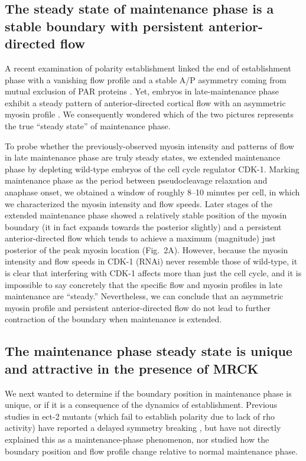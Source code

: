 \documentclass[11pt]{article}
\newcommand{\6}[1]{#1_{\text{6}}}
\newcommand{\3}[1]{#1_{\text{3}}}
\begin{document}
\subsection*{The steady state of maintenance phase is a stable boundary with persistent anterior-directed flow}
A recent examination of polarity establishment linked the end of establishment phase with a vanishing flow profile and a stable A/P asymmetry coming from mutual exclusion of PAR proteins \citep{gross2019guiding}. Yet, embryos in late-maintenance phase exhibit a steady pattern of anterior-directed cortical flow with an asymmetric myosin profile \citep[Fig.~2]{sailer2015dynamic}. We consequently wondered which of the two pictures represents the true ``steady state'' of maintenance phase.  

To probe whether the previously-observed myosin intensity and patterns of flow in late maintenance phase are truly steady states, we extended maintenance phase by depleting wild-type embryos of the cell cycle regulator CDK-1. Marking maintenance phase as the period between pseudocleavage relaxation and anaphase onset, we obtained a window of roughly 8--10 minutes per cell, in which we characterized the myosin intensity and flow speeds. Later stages of the extended maintenance phase showed a relatively stable position of the myosin boundary (it in fact expands towards the posterior slightly) and a persistent anterior-directed flow which tends to achieve a maximum (magnitude) just posterior of the peak myosin location (Fig.\ 2A). However, because the myosin intensity and flow speeds in CDK-1 (RNAi) never resemble those of wild-type, it is clear that interfering with CDK-1 affects more than just the cell cycle, and it is impossible to say concretely that the specific flow and myosin profiles in late maintenance are ``steady.'' Nevertheless, we can conclude that an asymmetric myosin profile and persistent anterior-directed flow do not lead to further contraction of the boundary when maintenance is extended.

\subsection*{The maintenance phase steady state is unique and attractive in the presence of MRCK}
We next wanted to determine if the boundary position in maintenance phase is unique, or if it is a consequence of the dynamics of establishment. Previous studies in ect-2 mutants (which fail to establish polarity due to lack of rho activity) have reported a delayed symmetry breaking \citep{zonies2010symmetry, tse2012rhoa}, but have not directly explained this as a maintenance-phase phenomenon, nor studied how the boundary position and flow profile change relative to normal maintenance phase. 
\end{document}
